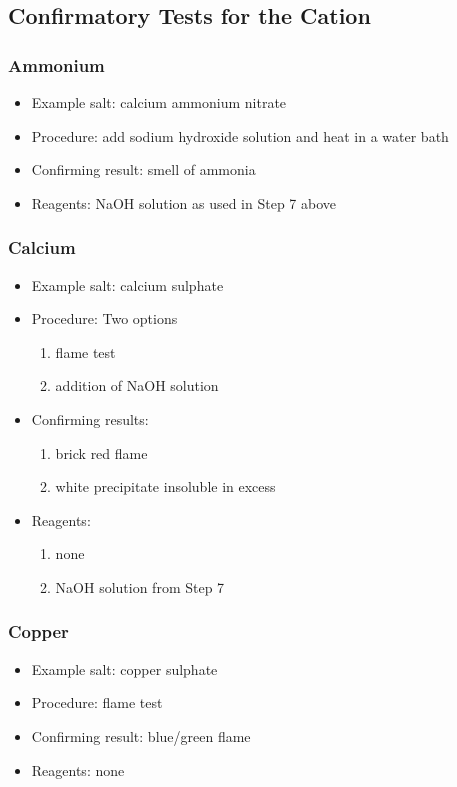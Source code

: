 \subsection{Confirmatory Tests for the Cation}

\subsubsection{Ammonium}
\begin{itemize}
\item{Example salt: calcium ammonium nitrate}
\item{Procedure: add sodium hydroxide solution and heat in a water bath}
\item{Confirming result: smell of ammonia} 
\item{Reagents: NaOH solution as used in Step 7 above}
\end{itemize}

\subsubsection{Calcium}
\begin{itemize}
\item{Example salt: calcium sulphate}

\item{Procedure: Two options
\begin{enumerate}
\item{flame test}
\item{addition of NaOH solution}
\end{enumerate}
} %

\item{Confirming results:
\begin{enumerate}
\item{brick red flame}
\item{white precipitate insoluble in excess}
\end{enumerate}
} %

\item{Reagents:
\begin{enumerate}
\item{none}
\item{NaOH solution from Step 7}
\end{enumerate}
} %

\end{itemize} %

\subsubsection{Copper}
\begin{itemize}
\item{Example salt: copper sulphate}
\item{Procedure: flame test}
\item{Confirming result: blue/green flame}
\item{Reagents: none}
\end{itemize}

